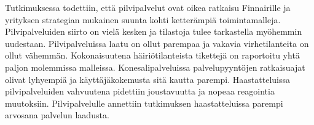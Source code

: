 Tutkimuksessa todettiin, että pilvipalvelut ovat oikea ratkaisu Finnairille ja yrityksen strategian mukainen suunta kohti ketterämpiä toimintamalleja. Pilvipalveluiden siirto on vielä kesken ja tilastoja tulee tarkastella myöhemmin uudestaan. Pilvipalveluissa laatu on ollut parempaa ja vakavia virhetilanteita on ollut vähemmän. Kokonaisuutena häiriötilanteista tikettejä on raportoitu yhtä paljon molemmissa malleissa. Konesalipalveluissa palvelupyyntöjen ratkaisuajat olivat lyhyempiä ja käyttäjäkokemusta sitä kautta parempi. Haastatteluissa pilvipalveluiden vahvuutena pidettiin joustavuutta ja nopeaa reagointia muutoksiin. Pilvipalvelulle annettiin tutkimuksen haastatteluissa parempi arvosana palvelun laadusta.
